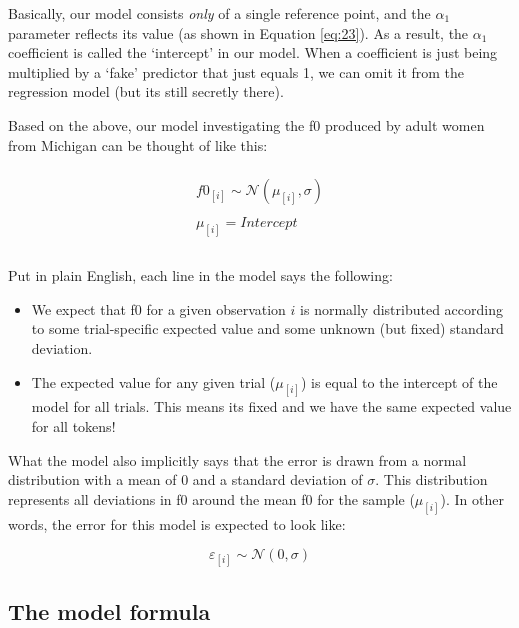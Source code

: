 \documentclass[
]{book}
\begin{document}
Basically, our model consists \emph{only} of a single reference point, and the \(\alpha_1\) parameter reflects its value (as shown in Equation \eqref{eq:23}). As a result, the \(\alpha_1\) coefficient is called the `intercept' in our model. When a coefficient is just being multiplied by a `fake' predictor that just equals 1, we can omit it from the regression model (but its still secretly there).

Based on the above, our model investigating the f0 produced by adult women from Michigan can be thought of like this:

\begin{equation}
\begin{split}
\\
f0_{[i]} \sim \mathcal{N}(\mu_{[i]},\sigma) \\ \\ 
\mu_{[i]} = Intercept \\ \\
\end{split}
\label{eq:24}
\end{equation}

Put in plain English, each line in the model says the following:

\begin{itemize}
\item
  We expect that f0 for a given observation \(i\) is normally distributed according to some trial-specific expected value and some unknown (but fixed) standard deviation.
\item
  The expected value for any given trial (\(\mu_{[i]}\)) is equal to the intercept of the model for all trials. This means its fixed and we have the same expected value for all tokens!
\end{itemize}

What the model also implicitly says that the error is drawn from a normal distribution with a mean of 0 and a standard deviation of \(\sigma\). This distribution represents all deviations in f0 around the mean f0 for the sample (\(\mu_{[i]}\)). In other words, the error for this model is expected to look like:

\[
\varepsilon_{[i]} \sim \mathcal{N}(0,\sigma)
\label{eq:25}
\]

\hypertarget{the-model-formula}{%
\subsection{The model formula}\label{the-model-formula}}
\end{document}

